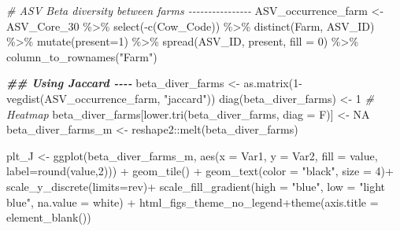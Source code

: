 \documentclass[
]{article}
\newenvironment{Shaded}{\begin{snugshade}}{\end{snugshade}}
\newcommand{\AttributeTok}[1]{\textcolor[rgb]{0.77,0.63,0.00}{#1}}
\newcommand{\CommentTok}[1]{\textcolor[rgb]{0.56,0.35,0.01}{\textit{#1}}}
\newcommand{\ConstantTok}[1]{\textcolor[rgb]{0.00,0.00,0.00}{#1}}
\newcommand{\DecValTok}[1]{\textcolor[rgb]{0.00,0.00,0.81}{#1}}
\newcommand{\DocumentationTok}[1]{\textcolor[rgb]{0.56,0.35,0.01}{\textbf{\textit{#1}}}}
\newcommand{\FunctionTok}[1]{\textcolor[rgb]{0.00,0.00,0.00}{#1}}
\newcommand{\NormalTok}[1]{#1}
\newcommand{\OtherTok}[1]{\textcolor[rgb]{0.56,0.35,0.01}{#1}}
\newcommand{\SpecialCharTok}[1]{\textcolor[rgb]{0.00,0.00,0.00}{#1}}
\newcommand{\StringTok}[1]{\textcolor[rgb]{0.31,0.60,0.02}{#1}}
\begin{document}
\begin{Shaded}
\begin{Highlighting}[]
\CommentTok{\# ASV Beta diversity between farms {-}{-}{-}{-}{-}{-}{-}{-}{-}{-}{-}{-}{-}{-}{-}{-}}
\NormalTok{ASV\_occurrence\_farm }\OtherTok{\textless{}{-}} 
\NormalTok{  ASV\_Core\_30 }\SpecialCharTok{\%\textgreater{}\%}
  \FunctionTok{select}\NormalTok{(}\SpecialCharTok{{-}}\FunctionTok{c}\NormalTok{(Cow\_Code)) }\SpecialCharTok{\%\textgreater{}\%}
  \FunctionTok{distinct}\NormalTok{(Farm, ASV\_ID) }\SpecialCharTok{\%\textgreater{}\%}
  \FunctionTok{mutate}\NormalTok{(}\AttributeTok{present=}\DecValTok{1}\NormalTok{) }\SpecialCharTok{\%\textgreater{}\%} 
  \FunctionTok{spread}\NormalTok{(ASV\_ID, present, }\AttributeTok{fill =} \DecValTok{0}\NormalTok{) }\SpecialCharTok{\%\textgreater{}\%}
  \FunctionTok{column\_to\_rownames}\NormalTok{(}\StringTok{"Farm"}\NormalTok{)}

\DocumentationTok{\#\# Using Jaccard {-}{-}{-}{-}}
\NormalTok{beta\_diver\_farms }\OtherTok{\textless{}{-}} \FunctionTok{as.matrix}\NormalTok{(}\DecValTok{1}\SpecialCharTok{{-}}\FunctionTok{vegdist}\NormalTok{(ASV\_occurrence\_farm, }\StringTok{"jaccard"}\NormalTok{))}
\FunctionTok{diag}\NormalTok{(beta\_diver\_farms) }\OtherTok{\textless{}{-}} \DecValTok{1}
\CommentTok{\# Heatmap}
\NormalTok{beta\_diver\_farms[}\FunctionTok{lower.tri}\NormalTok{(beta\_diver\_farms, }\AttributeTok{diag =}\NormalTok{ F)] }\OtherTok{\textless{}{-}} \ConstantTok{NA}
\NormalTok{beta\_diver\_farms\_m }\OtherTok{\textless{}{-}}\NormalTok{ reshape2}\SpecialCharTok{::}\FunctionTok{melt}\NormalTok{(beta\_diver\_farms) }

\NormalTok{plt\_J }\OtherTok{\textless{}{-}} \FunctionTok{ggplot}\NormalTok{(beta\_diver\_farms\_m, }\FunctionTok{aes}\NormalTok{(}\AttributeTok{x =}\NormalTok{ Var1, }\AttributeTok{y =}\NormalTok{ Var2, }\AttributeTok{fill =}\NormalTok{ value, }\AttributeTok{label=}\FunctionTok{round}\NormalTok{(value,}\DecValTok{2}\NormalTok{))) }\SpecialCharTok{+}
  \FunctionTok{geom\_tile}\NormalTok{() }\SpecialCharTok{+} 
  \FunctionTok{geom\_text}\NormalTok{(}\AttributeTok{color =} \StringTok{"black"}\NormalTok{, }\AttributeTok{size =} \DecValTok{4}\NormalTok{)}\SpecialCharTok{+}
  \FunctionTok{scale\_y\_discrete}\NormalTok{(}\AttributeTok{limits=}\NormalTok{rev)}\SpecialCharTok{+}
  \FunctionTok{scale\_fill\_gradient}\NormalTok{(}\AttributeTok{high =} \StringTok{"blue"}\NormalTok{, }\AttributeTok{low =} \StringTok{"light blue"}\NormalTok{, }\AttributeTok{na.value =} \StringTok{\textquotesingle{}white\textquotesingle{}}\NormalTok{) }\SpecialCharTok{+}
\NormalTok{  html\_figs\_theme\_no\_legend}\SpecialCharTok{+}\FunctionTok{theme}\NormalTok{(}\AttributeTok{axis.title =} \FunctionTok{element\_blank}\NormalTok{())}


\end{Highlighting}
\end{Shaded}
\end{document}
